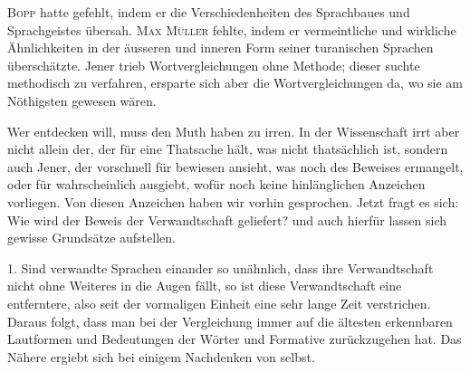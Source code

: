 \textsc{Bopp} hatte gefehlt, indem er die Verschiedenheiten des Sprachbaues und Sprachgeistes übersah. \textsc{Max Müller} fehlte, indem er vermeintliche und wirkliche Ähnlichkeiten in der äusseren und inneren Form seiner turanischen Sprachen überschätzte. Jener trieb Wortvergleichungen ohne Methode; dieser suchte methodisch zu verfahren, ersparte sich aber die Wortvergleichungen da, wo sie am Nöthigsten gewesen wären.


Wer entdecken will, muss den Muth haben zu irren. In der Wissenschaft irrt aber nicht allein der, der für eine Thatsache hält, was nicht thatsächlich ist, sondern auch Jener, der vorschnell für bewiesen ansieht, was noch des Beweises ermangelt, oder für wahrscheinlich ausgiebt, wofür noch keine hinlänglichen Anzeichen vorliegen. Von diesen Anzeichen haben wir vorhin gesprochen. Jetzt fragt es sich: Wie wird der Beweis der Verwandtschaft geliefert? und auch hierfür lassen sich gewisse Grundsätze aufstellen.

\label{III.I.I.2B1}1. Sind verwandte Sprachen einander so unähnlich, dass ihre Verwandtschaft nicht ohne Weiteres in die Augen fällt, so ist diese Verwandtschaft eine entferntere, also seit der vormaligen Einheit eine sehr lange Zeit verstrichen. Daraus folgt, dass man bei der Vergleichung immer auf die ältesten erkennbaren Lautformen und Bedeutungen der Wörter und Formative zurückzugehen hat. Das Nähere ergiebt sich bei einigem Nachdenken von selbst.

